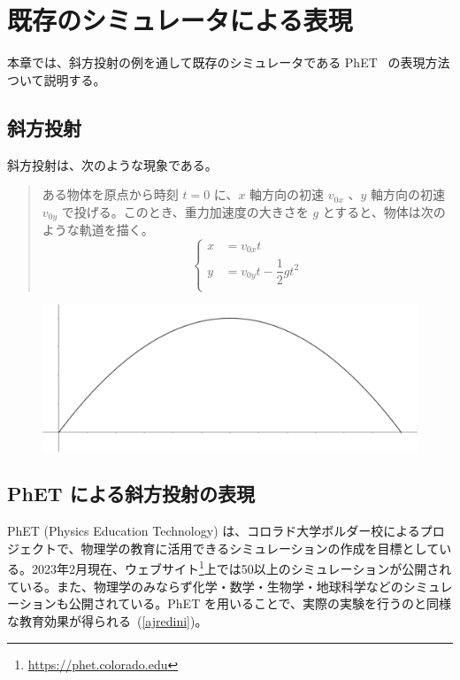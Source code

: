 \chapter{既存のシミュレータによる表現} \label{background}

本章では、斜方投射の例を通して既存のシミュレータである PhET~\cite{perkins_phet_2006} の表現方法ついて説明する。

\section{斜方投射}
斜方投射は、次のような現象である。
\begin{quote}
ある物体を原点から時刻 $t=0$ に、$x$ 軸方向の初速 $v_{0x}$ 、$y$ 軸方向の初速 $v_{0y}$ で投げる。このとき、重力加速度の大きさを $g$ とすると、物体は次のような軌道を描く。
$$
\left\{
\begin{aligned}
  x &= v_{0x} t \\
  y &= v_{0y} t - \dfrac{1}{2}gt^2 \\
\end{aligned}
\right.
$$
\end{quote}

\begin{figure}[H]
\centering
\includegraphics[width=0.9\linewidth]{figure/curve.png}
\end{figure}

\section{PhET による斜方投射の表現}

PhET (Physics Education Technology) は、コロラド大学ボルダー校によるプロジェクトで、物理学の教育に活用できるシミュレーションの作成を目標としている。2023年2月現在、ウェブサイト\footnote{\url{https://phet.colorado.edu}}上では50以上のシミュレーションが公開されている。また、物理学のみならず化学・数学・生物学・地球科学などのシミュレーションも公開されている。PhET を用いることで、実際の実験を行うのと同様な教育効果が得られる~\cite{ajredini_real_2014}(\ref{ajredini})。

